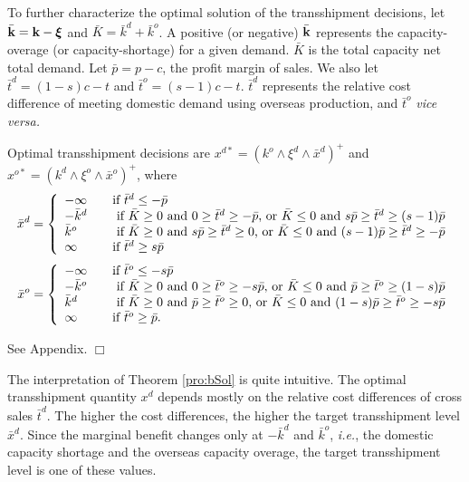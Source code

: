 \documentclass[mnsc,nonblindrev,copyedit]{informs2_wz} %
\newcommand{\proof}{\noindent{\bf Proof: } }
\newcommand{\qed}{ \hfill $\Box$ }
\newcommand{\xiv}{\mbox{\boldmath$\xi$}}
\begin{document}
To further characterize the optimal solution of the transshipment decisions, let $\bar{\bold k} = \bold k - \xiv$ and $\bar{K} = \bar{k}^d+\bar{k}^o$.  A positive (or negative) $\bar{\bold k}$ represents the capacity-overage (or capacity-shortage) for a given demand.  $\bar{K}$ is the total capacity net total demand.  Let $\bar{p} = p-c$, the profit margin of sales.  We also let $\bar{t}^d = (1-s)c-t$ and $\bar{t}^o = (s-1)c-t$.  $\bar{t}^d$ represents the relative cost difference of meeting domestic demand using overseas production, and $\bar{t}^o$ {\it vice versa.}


{\theorem Optimal transshipment decisions are $x^{d*} = (k^o\wedge \xi^d \wedge \bar{x}^d)^+$ and $x^{o*} = (k^d\wedge \xi^o \wedge \bar{x}^o)^+$, where
\begin{eqnarray}
\bar{x}^d= \left\{
  \begin{array} {ll}
  -\infty  \quad & \mbox {if $\bar{t}^d \leq -\bar{p}$}\\
  -\bar{k}^d  \quad & \mbox{ if $\bar{K} \geq 0$ and $0 \geq \bar{t}^d
  \geq -\bar{p}$, or $\bar{K} \leq 0$ and $ s\bar{p} \geq
  \bar{t}^d \geq (s-1) \bar{p}$} \\
\bar{k}^o  \quad  & \mbox{ if $\bar{K} \geq 0$ and $s\bar{p} \geq
\bar{t}^d \geq 0$, or $\bar{K} \leq 0$ and $  (s-1) \bar{p}\geq
  \bar{t}^d \geq -\bar{p}$}\\
  \infty \quad &\mbox {if $\bar{t}^d \geq s\bar{p}$}
  \end{array} \right.
\end{eqnarray}
\begin{eqnarray} \bar{x}^o= \left\{
  \begin{array} {ll}
  -\infty \quad & \mbox {if $\bar{t}^o \leq -s\bar{p}$}\\
  -\bar{k}^o \quad & \mbox{ if $\bar{K} \geq 0$ and $0 \geq
  \bar{t}^o
  \geq -s\bar{p}$, or $\bar{K} \leq 0$ and $ \bar{p} \geq
  \bar{t}^o \geq (1-s) \bar{p}$} \\
\bar{k}^d  \quad  & \mbox{ if $\bar{K} \geq 0$ and $\bar{p} \geq
\bar{t}^o \geq 0$, or $\bar{K} \leq 0$ and $  (1-s) \bar{p}\geq
  \bar{t}^o \geq -s\bar{p}$}\\
  \infty \quad &\mbox {if $\bar{t}^o \geq \bar{p}$.}
  \end{array} \right.
\end{eqnarray}
\label{pro:bSol}}

\proof See Appendix. \qed

The interpretation of Theorem \ref{pro:bSol} is quite intuitive.  The optimal transshipment quantity $x^d$ depends mostly on the relative cost differences of cross sales $ \bar{t}^d$.  The higher the cost differences, the higher the target transshipment level $\bar{x}^d$.  Since the marginal benefit changes only at $-\bar{k}^d$ and $\bar{k}^o$, {\it i.e.}, the domestic capacity shortage and the overseas capacity overage, the target transshipment level is one of these values.
\end{document}
